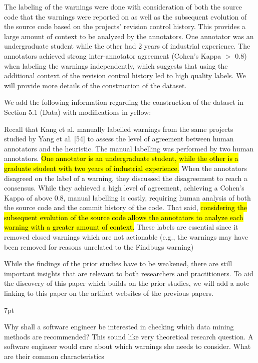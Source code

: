 \documentclass[compsoc,10pt]{IEEEtran}
\newenvironment{formal}{%
  \def\FrameCommand{%
    \hspace{1pt}%
    {\color{darkblue}\vrule width 2pt}%
    {\color{formalshade}\vrule width 4pt}%
    \colorbox{formalshade}%
  }%
  \MakeFramed{\advance\hsize-\width\FrameRestore}%
  \noindent\hspace{-1pt}%
  \begin{adjustwidth}{}{7pt}%
  \vspace{2pt}\vspace{2pt}%
}
{%
  \vspace{3pt}\end{adjustwidth}\endMakeFramed%
}
\newcommand{\respto}[1]{
\fcolorbox{black}{black!15}{%
\label{resp:#1}%
\bf\scriptsize R{#1}}}
\newcommand{\BLUE}{\color{blue}}
\newcommand{\BLACK}{\color{black}}
\newenvironment{response}[1]{
    \BLUE \respto{#1}
} {
    \BLACK
}
\begin{document}
\begin{response}{1a9}
The labeling of the warnings were done with consideration of both the source code that the warnings were reported on as well as the subsequent evolution of the source code based on the projects’ revision control history. This provides a large amount of context to be analyzed by the annotators. One annotator was an undergraduate student while the other had 2 years of industrial experience. The annotators achieved strong inter-annotator agreement (Cohen’s Kappa $>$ 0.8) when labeling the warnings independently, which suggests that using the additional context of the revision control history led to high quality labels. We will provide more details of the construction of the dataset. 

We add the following information regarding the construction of the dataset in Section 5.1 (Data) with modifications in yellow:

\begin{blockquote}
{Recall that Kang et al. manually labelled warnings from the same projects studied by Yang et al. [54] to assess the level of agreement between human annotators and the heuristic. The manual labelling was performed by two human annotators. \hl{One annotator is an undergraduate student, while the other is a graduate student with two years of industrial experience.} When the annotators disagreed on the label of a warning, they discussed the disagreement to reach a consensus. While they achieved a high level of agreement, achieving a Cohen’s Kappa of above 0.8, manual labelling is costly, requiring human analysis of both the source code and the commit history of the code. That said, \hl{considering the subsequent evolution of the source code allows the annotators to analyze each warning with a greater amount of context.} These labels are essential since it removed closed warnings which are not actionable (e.g., the warnings may have been removed for reasons unrelated to the Findbugs warning)}
\end{blockquote}

While the findings of the prior studies have to be weakened, there are still important insights that are relevant to both researchers and practitioners. To aid the discovery of this paper which builds on the prior studies, we will add a note linking to this paper on the artifact websites of the previous papers.
\end{response}

\begin{formal}
Why shall a software engineer be interested in checking which data mining methods are recommended? This sound like very theoretical research question. A software engineer would care about which warnings she needs to consider. What are their common characteristics
\end{formal}
\end{document}
